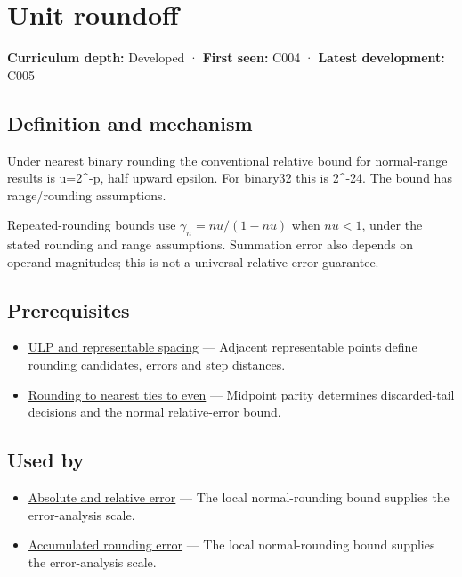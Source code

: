 \hypertarget{appendix-bc44f7b42f42}{}
\section{Unit roundoff}\label{appendix-bc44f7b42f42-unit-roundoff}

\textbf{Curriculum depth:} Developed · \textbf{First seen:} C004 · \textbf{Latest development:} C005

\subsection{Definition and mechanism}\label{appendix-bc44f7b42f42-definition-and-mechanism}

Under nearest binary rounding the conventional relative bound for normal-range results is u=2\^{}-p, half upward epsilon. For binary32 this is 2\^{}-24. The bound has range/rounding assumptions.

Repeated-rounding bounds use \(\gamma_n=nu/(1-nu)\) when \(nu<1\), under the stated rounding and range assumptions. Summation error also depends on operand magnitudes; this is not a universal relative-error guarantee.

\subsection{Prerequisites}\label{appendix-bc44f7b42f42-prerequisites}

\begin{itemize}
\tightlist
\item
  \hyperref[appendix-14bab4cab9d4]{ULP and representable spacing} --- Adjacent representable points define rounding candidates, errors and step distances.
\item
  \hyperref[appendix-614afe1de592]{Rounding to nearest ties to even} --- Midpoint parity determines discarded-tail decisions and the normal relative-error bound.
\end{itemize}

\subsection{Used by}\label{appendix-bc44f7b42f42-used-by}

\begin{itemize}
\tightlist
\item
  \hyperref[appendix-3ae74e89b4e6]{Absolute and relative error} --- The local normal-rounding bound supplies the error-analysis scale.
\item
  \hyperref[appendix-f82e270791c8]{Accumulated rounding error} --- The local normal-rounding bound supplies the error-analysis scale.
\end{itemize}

